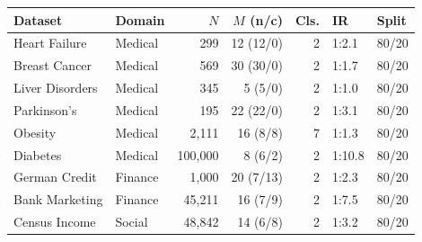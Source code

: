 \begin{tabular}{@{}llrrrll@{}}
\toprule
\textbf{Dataset} & \textbf{Domain} & \textbf{$N$} & \textbf{$M$ (n/c)} & \textbf{Cls.} & \textbf{IR} & \textbf{Split} \\
\midrule
Heart Failure & Medical & 299 & 12 (12/0) & 2 & 1:2.1 & 80/20 \\
Breast Cancer & Medical & 569 & 30 (30/0) & 2 & 1:1.7 & 80/20 \\
Liver Disorders & Medical & 345 & 5 (5/0) & 2 & 1:1.0 & 80/20 \\
Parkinson's & Medical & 195 & 22 (22/0) & 2 & 1:3.1 & 80/20 \\
Obesity & Medical & 2,111 & 16 (8/8) & 7 & 1:1.3 & 80/20 \\
Diabetes & Medical & 100,000 & 8 (6/2) & 2 & 1:10.8 & 80/20 \\
German Credit & Finance & 1,000 & 20 (7/13) & 2 & 1:2.3 & 80/20 \\
Bank Marketing & Finance & 45,211 & 16 (7/9) & 2 & 1:7.5 & 80/20 \\
Census Income & Social & 48,842 & 14 (6/8) & 2 & 1:3.2 & 80/20 \\
\bottomrule
\end{tabular}
